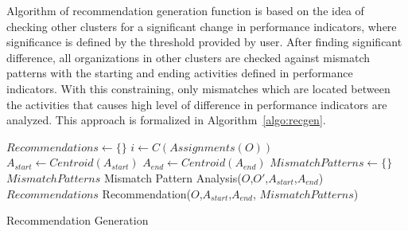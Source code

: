 Algorithm of recommendation generation function is based on the idea of checking other clusters for a significant change in performance indicators, where significance is defined by the threshold provided by user. After finding significant difference, all organizations in other clusters are checked against mismatch patterns with the starting and ending activities defined in performance indicators. With this constraining, only mismatches which are located between the activities that causes high level of difference in performance indicators are analyzed. This approach is formalized in Algorithm~\ref{algo:recgen}.
 
\begin{algorithm}
\DontPrintSemicolon %
$Recommendations \leftarrow \{\}$ \;
$i \leftarrow C(Assignments(O))$ \;
 { 
	 { 
		 {
			 {
				$A_{start} \leftarrow Centroid(A_{start})$ \;
				$A_{end} \leftarrow Centroid(A_{end})$ \;
				$MismatchPatterns \leftarrow \{\}$ \;
				 {
					$MismatchPatterns$ \leftarrow  Mismatch Pattern Analysis($O$,$O'$,$A_{start}$,$A_{end}$) \;
				}
				$Recommendations$ \leftarrow  Recommendation($O$,$A_{start}$,$A_{end}$, $MismatchPatterns$) \;
			}
		}
	}
}
 \;
\caption{Recommendation Generation}
\label{algo:recgen}
\end{algorithm}


